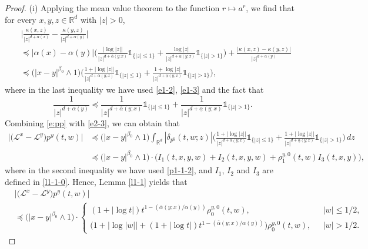 \documentclass[a4paper,11pt]{amsart}
\renewcommand{\le}{\leqslant}
\newcommand{\R}{\mathds R}
\newcommand{\B}{\beta}
\newcommand{\I}{\mathds 1}
\newcommand{\p}{\preceq}
\newcommand{\K}{\kappa}
\newcommand{\A}{\alpha}
\def\LL{{\mathcal L}}
\theoremstyle{definition}
\begin{document}
\begin{proof} (i)
Applying the mean value theorem to the function $r\mapsto a^r$, we find that for every $x,y,z \in \R^d$ with
$|z|>0$,
\begin{equation}\label{e:pp}
\begin{split}
&\bigg|\frac{\K(x,z)}{|z|^{d+\A(x)}}-\frac{\K(y,z)}{|z|^{d+\A(y)}}\bigg|\\
&\p |\A(x)-\A(y)|\bigg(\frac{|\log|z||}{|z|^{d+\overline{\A}(y;x)}}\I_{\{|z|\le 1\}}+
\frac{\log|z|}{|z|^{d+\underline{\A}(y;x)}}\I_{\{|z|> 1\}}\bigg)  +\frac{|\K(x,z)-\K(y,z)|}{|z|^{d+\A(y)}}\\
&\p \big(|x-y|^{\B_0}\wedge
1\big)\bigg(\frac{1+|\log|z||}{|z|^{d+\overline
\A(y;x)}}\I_{\{|z|\le 1\}}+ \frac{1+\log|z|}{|z|^{d+\underline
\A(y;x)}}\I_{\{|z|> 1\}}\bigg),
\end{split}
\end{equation}
where in the last inequality we have used \eqref{e1-2}, \eqref{e1-3} and the
fact that
\begin{equation*}
\frac{1}{|z|^{d+\A(y)}}\p \frac{1}{|z|^{d+\overline
\A(y;x)}}\I_{\{|z|\le 1\}}+ \frac{1}{|z|^{d+\underline
\A(y;x)}}\I_{\{|z|> 1\}}.
\end{equation*}
Combining \eqref{e:pp} with \eqref{e2-3}, we can obtain that
\begin{align*}
 \big|\big( \LL^x- \LL^y\big)p^y(t,w)\big|
& \p
\big(|x-y|^{\B_0}\wedge 1\big) \int_{\R^d}|\delta_{p^y}(t,w;z)|\bigg(
\frac{1+|\log|z||}{|z|^{d+\overline{\A}(y;x)}}\I_{\{|z|\le 1\}}+\frac{1+|\log|z||}{|z|^{d+\underline{\A}(y;x)}}\I_{\{|z|> 1\}}\bigg)\,dz\\
&\p\big(|x-y|^{\B_0}\wedge 1\big)\cdot \big(I_1(t,x,y,w)+I_2(t,x,y,w)+\rho^{y,0}_1(t,w)I_3(t,x,y)\big),
\end{align*}
where in the second inequality we have used \eqref{p1-1-2}, and $I_1$, $I_2$ and $I_3$ are defined in \eqref{l1-1-0}.
Hence, Lemma \ref{l1-1} yields that
\begin{equation}\label{l1-2-2}
\begin{split}
&\big|\big( \LL^x- \LL^y\big)p^y(t,w)\big|\\
&\p  \!\big(|x-y|^{\B_0}\wedge 1\big) \!\cdot\!
\begin{cases}
(1+|\log t|)t^{1-({\overline{\A}(y;x)}/{\A(y)})}\rho^{y,0}_0(t,w),\ \ &\ |w|\le {1}/{2},\\
\big(1+|\log |w||+(1+|\log t|)t^{1-({\overline{\A}(y;x)}/{\A(y)})}\big)\rho^{y,0}_0(t,w),\ \
&\ |w|>{1}/{2}.
\end{cases}
\end{split}

\end{equation}
\end{proof}
\end{document}
